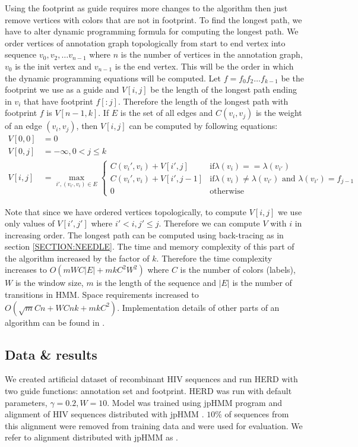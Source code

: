 Using the footprint as guide requires more changes to the algorithm then just
remove vertices with colors that are not in footprint. To find the longest path,
we have to alter dynamic programming formula for computing the longest path.
We order vertices of annotation graph topologically from start to end vertex
into sequence $v_0, v_2, \dots v_{n-1}$ where $n$ is the number of vertices in
the annotation graph, $v_0$ is the init vertex and $v_{n-1}$ is the end vertex.
This will be the order in which the dynamic programming equations will be
computed.
Let $f=f_0f_2\dots f_{k-1}$ be the footprint we use as a guide and $V[i, j]$ be the length
of the longest path ending in $v_i$ that have footprint $f[:j]$.  Therefore the
length of the longest path with footprint $f$ is $V[n - 1, k]$. If $E$ is the set of
all edges and $C(v_i, v_j)$ is the weight of an edge $(v_i, v_j)$, then $V[i,
j]$ can be computed by following equations: 
\begin{align} V[0, 0] &= 0 \\ V[0, j] &= -\infty, 0< j \leq k \\ V[i, j] &=
\max_{i', (v_{i'}, v_i)\in E} \begin{cases} C(v_i', v_i) + V[i', j]& \text{if
$\lambda(v_i) == \lambda(v_{i'})$}\\ C(v_i', v_i) + V[i', j-1]& \text{if
$\lambda(v_i) \not= \lambda(v_{i'})$ and $\lambda(v_{i'})=f_{j-1}$}\\ 0 &
\text{otherwise} \end{cases} \end{align}

Note that since we have ordered vertices topologically, to compute $V[i, j]$ we
use only values of $V[i', j']$ where $i'< i, j'\leq j$. Therefore we can compute
$V$ with $i$ in increasing order. The longest path can be computed using
back-tracing as in section \ref{SECTION:NEEDLE}. The time and memory complexity 
of this part of the algorithm increased by the factor of $k$. Therefore the time
complexity increases to $O(mWC|E|+mkC^2W^2)$ where $C$ is the number of colors
(labels), $W$ is the window size, $m$ is the length of the sequence and $|E|$ is
the number of transitions in HMM.  Space requirements increased to
$O(\sqrt{m}Cn+WCnk+mkC^2)$. Implementation details of other parts of an
algorithm can be found in \cite{Nanasi2010mgr}.

\subsection{Data \& results}
We created artificial dataset of recombinant HIV sequences and run HERD with two
guide functions: annotation set and footprint. HERD was run with default
parameters, $\gamma=0.2, W=10$. Model was trained using jpHMM program and
alignment of HIV sequences distributed with jpHMM \cite{Schultz2006}.  $10\%$ of
sequences from this alignment were removed from training data and were used for
evaluation. We refer to alignment distributed with jpHMM as .


